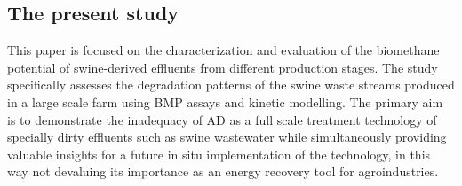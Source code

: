\subsection{The present study}
This paper is focused on the characterization and evaluation of the biomethane potential of swine-derived effluents from different production stages. The study specifically assesses the degradation patterns of the swine waste streams produced in a large scale farm using BMP assays and kinetic modelling. The primary aim is to demonstrate the inadequacy of AD as a full scale treatment technology of specially dirty effluents such as swine wastewater while simultaneously providing valuable insights for a future in situ implementation of the technology, in this way not devaluing its importance as an energy recovery tool for agroindustries.